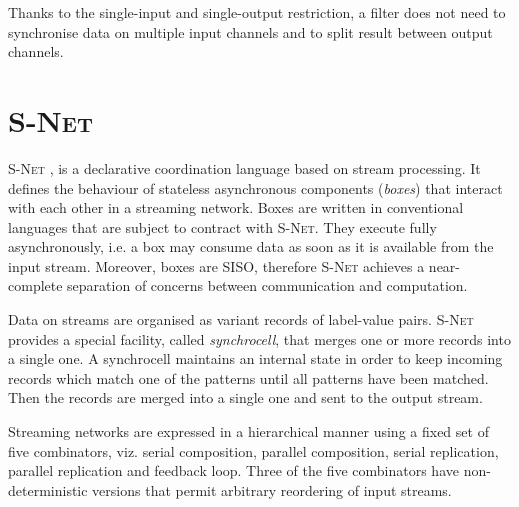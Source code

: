 Thanks to the single-input and single-output restriction, a filter does not need to synchronise data on multiple input channels and to split result between output channels.


    \section{\textsc{S-Net}}
\textsc{S-Net} \cite{snet_intro}, \cite{ceng_snet} is a declarative coordination language based on stream processing. It defines the behaviour of stateless asynchronous components (\emph{boxes}) that interact with each other in a streaming network. Boxes are written in conventional languages that are subject to contract with \textsc{S-Net}. They execute fully asynchronously, i.e. a box may consume data as soon as it is available from the input stream. Moreover, boxes are SISO, therefore \textsc{S-Net} achieves a near-complete separation of concerns between communication and computation.

Data on streams are organised as variant records of label-value pairs. \textsc{S-Net} provides a special facility, called \emph{synchrocell}, that merges one or more records into a single one. A synchrocell maintains an internal state in order to keep incoming records which match one of the patterns until all patterns have been matched. Then the records are merged into a single one and sent to the output stream.

Streaming networks are expressed in a hierarchical manner using a fixed set of five combinators, viz. serial composition, parallel composition, serial replication, parallel replication and feedback loop. Three of the five combinators have non-deterministic versions that permit arbitrary reordering of input streams.


